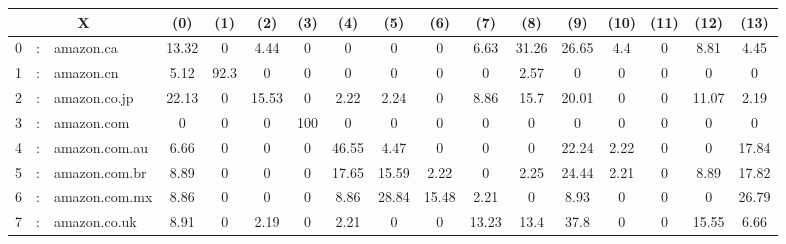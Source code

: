 \documentclass[crop]{standalone}
\begin{document}
\begin{tabular}{|lcl|c|c|c|c|c|c|c|c|c|c|c|c|c|c|} \hline
\multicolumn{3}{|c|}{X} & (0) & (1) & (2) & (3) & (4) & (5) & (6) & (7) & (8) & (9) & (10) & (11) & (12) & (13) \\ \hline
0 & : & amazon.ca & \cellcolor{green!13.319999999999999}13.32 & 0 & \cellcolor{red!4.4399999999999995}4.44 & 0 & 0 & 0 & 0 & \cellcolor{red!6.629999999999998}6.63 & \cellcolor{red!31.259999999999998}31.26 & \cellcolor{red!26.649999999999995}26.65 & \cellcolor{red!4.3999999999999995}4.4 & 0 & \cellcolor{red!8.81}8.81 & \cellcolor{red!4.45}4.45 \\ \hline
1 & : & amazon.cn & \cellcolor{red!5.12}5.12 & \cellcolor{green!92.3}92.3 & 0 & 0 & 0 & 0 & 0 & 0 & \cellcolor{red!2.57}2.57 & 0 & 0 & 0 & 0 & 0 \\ \hline
2 & : & amazon.co.jp & \cellcolor{red!22.130000000000006}22.13 & 0 & \cellcolor{green!15.530000000000005}15.53 & 0 & \cellcolor{red!2.2200000000000006}2.22 & \cellcolor{red!2.240000000000001}2.24 & 0 & \cellcolor{red!8.860000000000003}8.86 & \cellcolor{red!15.700000000000003}15.7 & \cellcolor{red!20.01000000000001}20.01 & 0 & 0 & \cellcolor{red!11.070000000000004}11.07 & \cellcolor{red!2.190000000000001}2.19 \\ \hline
3 & : & amazon.com & 0 & 0 & 0 & \cellcolor{green!100}100 & 0 & 0 & 0 & 0 & 0 & 0 & 0 & 0 & 0 & 0 \\ \hline
4 & : & amazon.com.au & \cellcolor{red!6.660000000000001}6.66 & 0 & 0 & 0 & \cellcolor{green!46.55}46.55 & \cellcolor{red!4.47}4.47 & 0 & 0 & 0 & \cellcolor{red!22.24}22.24 & \cellcolor{red!2.22}2.22 & 0 & 0 & \cellcolor{red!17.84}17.84 \\ \hline
5 & : & amazon.com.br & \cellcolor{red!8.889999999999999}8.89 & 0 & 0 & 0 & \cellcolor{red!17.649999999999995}17.65 & \cellcolor{green!15.589999999999998}15.59 & \cellcolor{red!2.2199999999999998}2.22 & 0 & \cellcolor{red!2.2499999999999996}2.25 & \cellcolor{red!24.439999999999998}24.44 & \cellcolor{red!2.21}2.21 & 0 & \cellcolor{red!8.889999999999999}8.89 & \cellcolor{red!17.819999999999997}17.82 \\ \hline
6 & : & amazon.com.mx & \cellcolor{red!8.859999999999998}8.86 & 0 & 0 & 0 & \cellcolor{red!8.859999999999998}8.86 & \cellcolor{red!28.839999999999993}28.84 & \cellcolor{green!15.479999999999999}15.48 & \cellcolor{red!2.21}2.21 & 0 & \cellcolor{red!8.93}8.93 & 0 & 0 & 0 & \cellcolor{red!26.789999999999996}26.79 \\ \hline
7 & : & amazon.co.uk & \cellcolor{red!8.909999999999998}8.91 & 0 & \cellcolor{red!2.1899999999999995}2.19 & 0 & \cellcolor{red!2.21}2.21 & 0 & 0 & \cellcolor{green!13.229999999999997}13.23 & \cellcolor{red!13.399999999999999}13.4 & \cellcolor{red!37.79999999999999}37.8 & 0 & 0 & \cellcolor{red!15.549999999999997}15.55 & \cellcolor{red!6.659999999999999}6.66 \\ \hline

\end{tabular}
\end{document}
